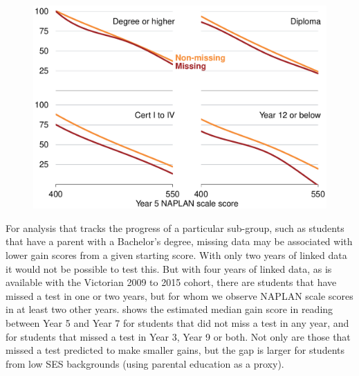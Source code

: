 \begin{figure}[t]
 \includegraphics[width=\columnwidth]{atlas/Missing_gain.pdf}\label{fig:missing_gain}

\end{figure}

For analysis that tracks the progress of a particular sub-group, such as students that have a parent with a Bachelor's degree, missing data may be associated with lower gain scores from a given starting score. With only two years of linked data it would not be possible to test this. But with four years of linked data, as is available with the Victorian 2009 to 2015 cohort, there are students that have missed a test in one or two years, but for whom we observe NAPLAN scale scores in at least two other years.  shows the estimated median gain score in reading between Year 5 and Year 7 for students that did not miss a test in any year, and for students that missed a test in Year 3, Year 9 or both. Not only are those that missed a test predicted to make smaller gains, but the gap is larger for students from low SES backgrounds (using parental education as a proxy).

